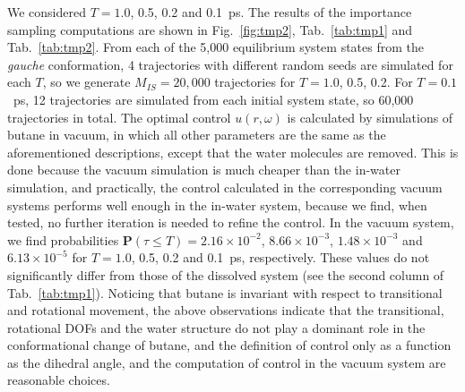 \documentclass[final]{siamltex}
\newcommand{\bP}{{\mathbf P}}
\begin{document}
We considered $T = 1.0$, 0.5, 0.2 and 0.1~ps. The results of the importance sampling computations are shown in Fig.~\ref{fig:tmp2}, Tab.~\ref{tab:tmp1} and Tab.~\ref{tab:tmp2}.
From each of the 5,000 equilibrium system states from the \emph{gauche} conformation, 4 trajectories with
different random seeds are simulated for each $T$, so we
generate $M_{IS}=20,000$ trajectories for $T = 1.0$, 0.5, 0.2.
For $T = 0.1$~ps, 12 trajectories are simulated from each
initial system state, so 60,000 trajectories in total.
The optimal control $u(r, \omega)$ is
calculated by simulations of butane in vacuum, in which all other
parameters are the same as the aforementioned descriptions, except
that the water molecules are removed. This is done because the vacuum
simulation is much cheaper than the in-water simulation, and
practically, the control calculated in the corresponding vacuum
systems performs well enough in the in-water system, because we find, when tested,
 no further iteration is needed to refine the control. In the vacuum system, we find  probabilities $\bP(\tau\leq T) =
2.16\times10^{-2}$, $8.66\times 10^{-3}$, $1.48\times 10^{-3}$ and
$6.13\times 10^{-5}$ for $T = 1.0$, 0.5, 0.2 and 0.1~ps,
respectively. These values do not significantly differ from those of the
dissolved system (see the second column of Tab.~\ref{tab:tmp1}).
Noticing that butane is invariant with respect to transitional and
rotational movement, the above observations  indicate that
the transitional, rotational DOFs and the water structure do not
play a dominant role in the conformational change of butane, and the
definition of control only as a function as the dihedral angle, and
the computation of control in the vacuum system are reasonable
choices.  
\end{document}

